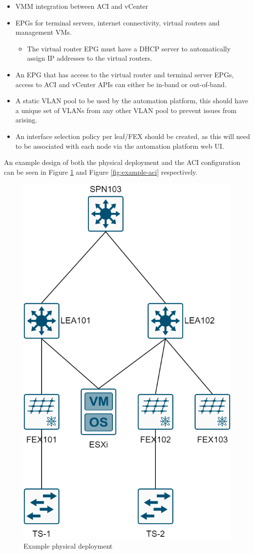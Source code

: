 \begin{itemize}
    \item VMM integration between ACI and vCenter
    \item EPGs for terminal servers, internet connectivity, virtual routers and management VMs.
          \begin{itemize}
              \item The virtual router EPG must have a DHCP server to automatically assign IP addresses to the virtual routers.
          \end{itemize}
    \item An EPG that has access to the virtual router and terminal server EPGs, access to ACI and vCenter APIs can either be in-band or out-of-band.
    \item A static VLAN pool to be used by the automation platform, this should have a unique set of VLANs from any other VLAN pool to prevent issues from arising.
    \item An interface selection policy per leaf/FEX should be created, as this will need to be associated with each node via the automation platform web UI.
\end{itemize}

An example design of both the physical deployment and the ACI configuration can be seen in Figure \ref{fig:example-deployment} and Figure \ref{fig:example-aci} respectively.

\begin{figure}[H]
    \centering
    \includegraphics[width=0.5\linewidth]{images/aci-topology.png}
    \caption{Example physical deployment}
    \label{fig:example-deployment}
\end{figure}

